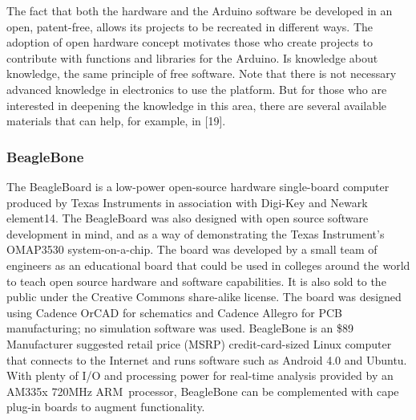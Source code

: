 \documentclass{acm_proc_article-sp}
\begin{document}
The fact that both the hardware and the Arduino software be developed in an open, patent-free, allows its projects to be recreated in different ways. The adoption of open hardware concept motivates those who create projects to contribute with functions and libraries for the Arduino. Is knowledge about knowledge, the same principle of free software.
\newline
\newline
Note that there is not necessary advanced knowledge in electronics to use the platform. But for those who are interested in deepening the knowledge in this area, there are several available materials that can help, for example, in [19].

\subsubsection{BeagleBone}
The BeagleBoard is a low-power open-source hardware single-board computer produced by Texas Instruments in association with Digi-Key and Newark element14. The BeagleBoard was also designed with open source software development in mind, and as a way of demonstrating the Texas Instrument's OMAP3530 system-on-a-chip\cite{coley2009take}. The board was developed by a small team of engineers as an educational board that could be used in colleges around the world to teach open source hardware and software capabilities. It is also sold to the public under the Creative Commons share-alike license. The board was designed using Cadence OrCAD for schematics and Cadence Allegro for PCB manufacturing; no simulation software was used.
\newline
\newline
BeagleBone is an \$89 Manufacturer suggested retail price (MSRP) credit-card-sized Linux computer that connects to the Internet and runs software such as Android 4.0 and Ubuntu. With plenty of I/O and processing power for real-time analysis provided by an AM335x 720MHz ARM\textregistered\, processor, BeagleBone can be complemented with cape plug-in boards to augment functionality.
\end{document}
